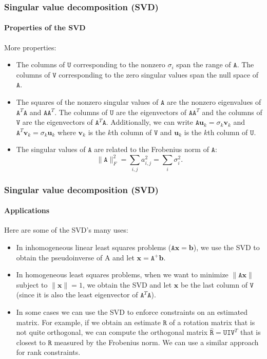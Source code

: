 \documentclass[aspectratio=169]{beamer}
\renewcommand{\vec}[1]{\boldsymbol{#1}}
\newcommand{\mat}[1]{\mathtt{#1}}
\begin{document}
\begin{frame}
\frametitle{Singular value decomposition (SVD)}
\framesubtitle{Properties of the SVD}

More properties:
\begin{itemize}
\item The \alert{columns} of $\mat{U}$ corresponding to the
  \alert{nonzero} $\sigma_i$ span the \alert{range} of $\mat{A}$.  The
  columns of $\mat{V}$ corresponding to the zero singular values span
  the null space of $\mat{A}$.
\item The \alert{squares of the nonzero singular values} of $\mat{A}$
  are the \alert{nonzero eigenvalues} of $\mat{A}^T\mat{A}$ and
  $\mat{A}\mat{A}^T$.  The \alert{columns} of $\mat{U}$ are the
  \alert{eigenvectors} of $\mat{A}\mat{A}^T$ and the \alert{columns}
  of $\mat{V}$ are the \alert{eigenvectors} of $\mat{A}^T\mat{A}$.
  Additionally, we can write $\mat{A}\vec{u}_k = \sigma_k \vec{v}_k$
  and $\mat{A}^T\vec{v}_k=\sigma_k\vec{u}_k$ where $\vec{v}_k$ is the
  $k$th column of $\mat{V}$ and $\vec{u}_k$ is the $k$th column of
  $\mat{U}$.
\item The singular values of $\mat{A}$ are related to the
  \alert{Frobenius norm} of $\mat{A}$:
\begin{equation*}
\|\mat{A}\|^2_F = \sum_{i,j}a_{i,j}^2 = \sum_i\sigma_i^2.
\end{equation*}
\end{itemize}

\end{frame}

\begin{frame}
\frametitle{Singular value decomposition (SVD)}
\framesubtitle{Applications}

Here are some of the SVD's many uses:
\begin{itemize}
\item In \alert{inhomogeneous} linear least squares problems
  ($\mat{A}\vec{x}=\vec{b}$), we use the SVD to obtain the
  pseudoinverse of A and let $\vec{x}=\mat{A}^+\vec{b}$.
\item In \alert{homogeneous} least squares problems, when we want to minimize
  $\|\mat{A}\vec{x}\|$ subject to $\|\vec{x}\|=1$, we obtain the SVD
  and let $\vec{x}$ be the last column of $\mat{V}$ (since it is also
  the least eigenvector of $\mat{A}^T\mat{A}$).
\item In some cases we can use the SVD to \alert{enforce constraints
    on an estimated matrix}.  For example, if we obtain an estimate
  $\mat{R}$ of a rotation matrix that is not quite orthogonal, we can
  compute the orthogonal matrix
  $\hat{\mat{R}}=\mat{U}\mat{I}\mat{V}^T$ that is closest to $\mat{R}$
  measured by the Frobenius norm.  We can use a similar approach for
  rank constraints.
\end{itemize}

\end{frame}
\end{document}
